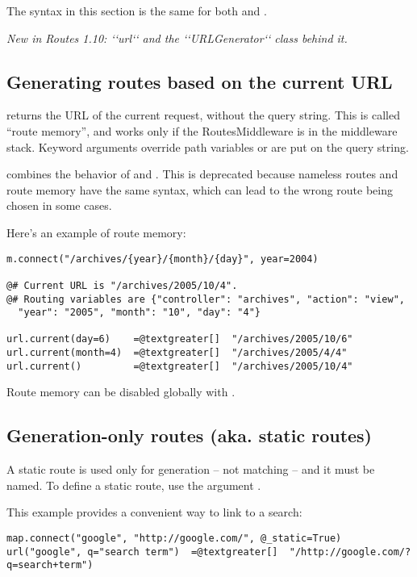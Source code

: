 \documentclass[letterpaper,10pt,english]{manual}
\begin{document}
The syntax in this section is the same for both  and .

\emph{New in Routes 1.10: {}`{}`url{}`{}` and the {}`{}`URLGenerator{}`{}` class behind it.}


\subsection{Generating routes based on the current URL}

 returns the URL of the current request, without the query
string.  This is called ``route memory'', and works only if the RoutesMiddleware
is in the middleware stack.  Keyword arguments override path variables or are
put on the query string.

 combines the behavior of  and .  This is
deprecated because nameless routes and route memory have the same syntax, which
can lead to the wrong route being chosen in some cases.

Here's an example of route memory:

\begin{Verbatim}[commandchars=@\[\]]
m.connect("/archives/{year}/{month}/{day}", year=2004)

@# Current URL is "/archives/2005/10/4".
@# Routing variables are {"controller": "archives", "action": "view",
  "year": "2005", "month": "10", "day": "4"}

url.current(day=6)    =@textgreater[]  "/archives/2005/10/6"
url.current(month=4)  =@textgreater[]  "/archives/2005/4/4"
url.current()         =@textgreater[]  "/archives/2005/10/4"
\end{Verbatim}

Route memory can be disabled globally with .


\subsection{Generation-only routes (aka. static routes)}

A static route is used only for generation -- not matching -- and it must be
named.  To define a static route, use the argument .

This example provides a convenient way to link to a search:

\begin{Verbatim}[commandchars=@\[\]]
map.connect("google", "http://google.com/", @_static=True)
url("google", q="search term")  =@textgreater[]  "/http://google.com/?q=search+term")
\end{Verbatim}
\end{document}
